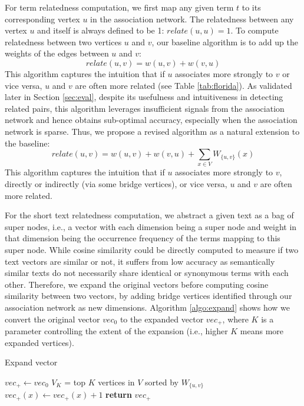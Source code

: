 \documentclass[letterpaper]{article}
\newcommand{\secref}[1]{Section \ref{#1}}
\newcommand{\tabref}[1]{Table \ref{#1}}
\begin{document}
For term relatedness computation, we first map any given term $t$ to
its corresponding vertex $u$ in the association network. 
The relatedness between any vertex $u$ and itself is always defined to be 1:
$relate(u,u)=1$.
To compute relatedness between two vertices $u$ and $v$, 
our baseline algorithm is to add up the weights of the edges
between $u$ and $v$: 
\begin{equation}
relate(u,v)=w(u,v)+w(v,u)
\label{eq:baseline}
\end{equation} 
This algorithm captures the intuition that if $u$ associates more 
strongly to $v$ or
vice versa, $u$ and $v$ are often more related (see \tabref{tab:florida}).
As validated later in \secref{sec:eval}, despite its usefulness and 
intuitiveness in detecting related pairs, this algorithm leverages
insufficient signals from the association network and hence obtains 
sub-optimal accuracy, especially when the association network is sparse.
Thus, we propose a revised algorithm as a natural extension to the 
baseline: 
\begin{equation}
relate(u,v)=w(u,v)+w(v,u)+\sum_{x\in V}W_{\{u, v\}}(x)
\label{eq:revised}
\end{equation}
This algorithm captures the intuition that if $u$ associates more strongly to $v$, 
directly or indirectly (via some bridge vertices), or vice versa, $u$ and $v$ are often more related.

For the short text relatedness computation, 
we abstract a given text as a bag of super nodes, i.e., a vector with each
dimension being a super node and weight in that dimension being
the occurrence frequency of the terms mapping to this super node. While
cosine similarity could be directly computed to measure if two text
vectors are similar or not, it suffers from low accuracy as
semantically similar texts do not necessarily share identical or
synonymous terms with each other. 
Therefore, we expand
the original vectors before computing cosine similarity between two
vectors, by adding bridge vertices identified through our
association network as new dimensions. Algorithm \ref{algo:expand}
shows how we convert the original vector $vec_0$ to the expanded
vector $vec_+$, where $K$ is a parameter controlling the extent of 
the expansion (i.e., higher $K$ means more expanded vertices).

\begin{algorithm}[th]
\caption{Expand vector}
\label{algo:expand}
\begin{algorithmic}[1]
\State $vec_+ \leftarrow vec_0$
\State $V_K$ = top $K$ vertices in $V$ sorted by $W_{\{u,v\}}$
\State $vec_+(x) \leftarrow vec_+(x) + 1$
\EndFor
\EndFor
\State \textbf{return} $vec_+$
\EndFunction
\end{algorithmic}
\end{algorithm}
\end{document}
